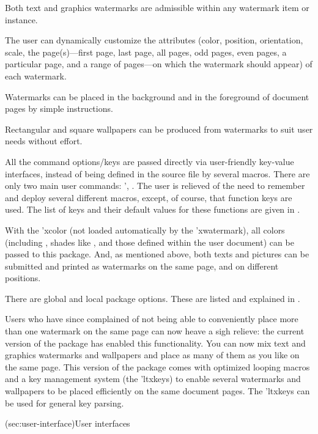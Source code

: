 \documentclass[
  use-a4-paper,
  use-10pt-font,
  final-version,
  use-UK-English,
  fancy-section-headings,
  frame-section-numbers,
  para-abstract-style,
  input-config-file,
  no-hyperref-messages,
  option-stack-limit=4,
  inputfile=true,
]{amltxdoc}
\begin{document}
\begin{enum}
\item Both text and graphics watermarks are admissible within any watermark item or instance.
\item The user can dynamically customize the attributes (color, position, orientation, scale, the page(s)---first page, last page, all pages, odd pages, even pages, a particular page, and a range of pages---on which the watermark should appear) of each watermark.
\item Watermarks can be placed in the background and in the foreground of document pages by simple instructions.
\item Rectangular and square wallpapers can be produced from watermarks to suit user needs without effort.
\item All the command options/keys are passed directly via user-friendly key-value interfaces, instead of being defined in the source file by several macros. There are only two main user commands: \ffx'{\newwatermark, \newwallpaper}. The user is relieved of the need to remember and deploy several different macros, except, of course, that function keys are used. The list of keys and their default values for these functions are given in .
\end{enum}

With the \pkg'{xcolor} (not loaded automatically by the \pkg'{xwatermark}), all colors (including , shades like , and those defined within the user document) can be passed to this package. And, as mentioned above, both texts and pictures can be submitted and printed as watermarks on the same page, and on different positions.

There are global and local package options. These are listed and explained in
.

Users who have since complained of not being able to conveniently place more than one watermark on the same page can now heave a sigh relieve: the current version of the package has enabled this functionality. You can now mix text and graphics watermarks and wallpapers and place as many of them as you like on the same page. This version of the package comes with optimized looping macros and a key management system (the \pkg'{ltxkeys}) to enable several watermarks and wallpapers to be placed efficiently on the same document pages. The \pkg'{ltxkeys} can be used for general key parsing.


\docsection(sec:user-interface){User interfaces}
\end{document}
